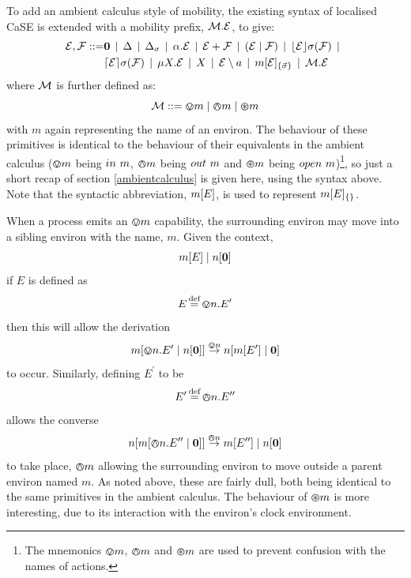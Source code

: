 To add an ambient calculus style of mobility, the existing syntax of
localised CaSE is extended with a mobility prefix, $\text{$\mathcal{M}$} . \text{$\mathcal{E}$}$,
to give:
\begin{equation}
  \begin{aligned}
    \text{$\mathcal{E}$}, \text{$\mathcal{F}$} \mathrel{::=} &
    \textbf{0}  \;\,|\,\; 
    \Delta \;\,|\,\; 
    \Delta_{\sigma} \;\,|\,\; 
    \alpha . \text{$\mathcal{E}$}  \;\,|\,\;
    \text{$\mathcal{E}$} + \text{$\mathcal{F}$} \;\,|\,\; 
    (\text{$\mathcal{E}$}\;|\;\text{$\mathcal{F}$})\;\,|\,\; 
    \lfloor{\text{$\mathcal{E}$}}\rfloor {\sigma} ({\text{$\mathcal{F}$}}) \;\,|\,\; \\
    & \lceil{\text{$\mathcal{E}$}}\rceil {\sigma} ({\text{$\mathcal{F}$}}) \;\,|\,\; 
    \mu X . \text{$\mathcal{E}$} \;\,|\,\; 
    X \;\,|\,\; 
    \text{$\mathcal{E}$} \setminus a \;\,|\,\; 
    {m}[ \text{$\mathcal{E}$} ]_{\{\vec{\sigma}\}} \;\,|\,\;
    \text{$\mathcal{M}$} . \text{$\mathcal{E}$}
  \end{aligned}
\end{equation}
where $\text{$\mathcal{M}$}$ is further defined as:
\begin{equation}
   \text{$\mathcal{M}$} \mathrel{::=} \varovee m \mid \varowedge m \mid \varoast m 
\end{equation}
with $m$ again representing the name of an environ.  The behaviour of
these primitives is identical to the behaviour of their equivalents in
the ambient calculus ($\varovee m$ being $in\ m$, $\varowedge m$ being
$out\ m$ and $\varoast m$ being $open\ m$)\footnote{The mnemonics
$\varovee m$, $\varowedge m$ and $\varoast m$ are used to prevent
confusion with the names of actions.}, so just a short recap of section
\ref{ambientcalculus} is given here, using the syntax above.  Note that
the syntactic abbreviation, ${m}[ E ]$, is used to represent
${m}[ E ]_{\{\}}$.

When a process emits an $\varovee m$ capability, the surrounding environ
may move into a sibling environ with the name, $m$.  Given the context,
\begin{equation}
{m}[ E ]\;|\;{n}[ \textbf{0} ]
\end{equation}
if $E$ is defined as
\begin{equation}
E \operatorname{\stackrel{\textrm{def}}{=}} \varovee n.E^\prime
\end{equation}
then this will allow the derivation
\begin{equation}
{m}[ \varovee n.E^\prime \;|\; {n}[ \textbf{0} ] ] \stackrel{\varovee n}{\rightarrow} 
{n}[ {m}[ E^\prime ] \;|\; \textbf{0} ]
\end{equation}
to occur.  Similarly, defining $E^\prime$ to be
\begin{equation}
E^\prime \operatorname{\stackrel{\textrm{def}}{=}} \varowedge n.E^{\prime\prime}
\end{equation}
allows the converse
\begin{equation}
{n}[ {m}[ \varowedge n.E^{\prime\prime}\;|\;\textbf{0} ] ] \stackrel{\varowedge n}{\rightarrow}
{m}[ E^{\prime\prime} ]\;|\;{n}[ \textbf{0} ]
\end{equation}
to take place, $\varowedge m$ allowing the surrounding environ
to move outside a parent environ named $m$.  As noted above, these are
fairly dull, both being identical to the same primitives in the ambient
calculus.  The behaviour of $\varoast m$ is more interesting, due to
its interaction with the environ's clock environment.

